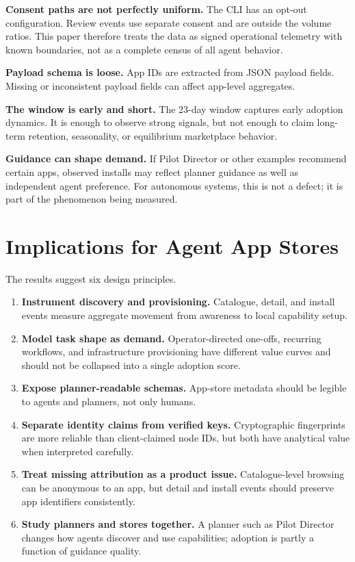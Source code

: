 \documentclass[10pt,twocolumn]{article}
\newcommand{\director}{Pilot Director}
\begin{document}
\textbf{Consent paths are not perfectly uniform.} The CLI has an opt-out configuration. Review events use separate consent and are outside the volume ratios. This paper therefore treats the data as signed operational telemetry with known boundaries, not as a complete census of all agent behavior.

\textbf{Payload schema is loose.} App IDs are extracted from JSON payload fields. Missing or inconsistent payload fields can affect app-level aggregates.

\textbf{The window is early and short.} The 23-day window captures early adoption dynamics. It is enough to observe strong signals, but not enough to claim long-term retention, seasonality, or equilibrium marketplace behavior.

\textbf{Guidance can shape demand.} If \director{} or other examples recommend certain apps, observed installs may reflect planner guidance as well as independent agent preference. For autonomous systems, this is not a defect; it is part of the phenomenon being measured.

\section{Implications for Agent App Stores}
\label{sec:implications}

The results suggest six design principles.

\begin{enumerate}
    \item \textbf{Instrument discovery and provisioning.} Catalogue, detail, and install events measure aggregate movement from awareness to local capability setup.
    \item \textbf{Model task shape as demand.} Operator-directed one-offs, recurring workflows, and infrastructure provisioning have different value curves and should not be collapsed into a single adoption score.
    \item \textbf{Expose planner-readable schemas.} App-store metadata should be legible to agents and planners, not only humans.
    \item \textbf{Separate identity claims from verified keys.} Cryptographic fingerprints are more reliable than client-claimed node IDs, but both have analytical value when interpreted carefully.
    \item \textbf{Treat missing attribution as a product issue.} Catalogue-level browsing can be anonymous to an app, but detail and install events should preserve app identifiers consistently.
    \item \textbf{Study planners and stores together.} A planner such as \director{} changes how agents discover and use capabilities; adoption is partly a function of guidance quality.
\end{enumerate}
\end{document}
